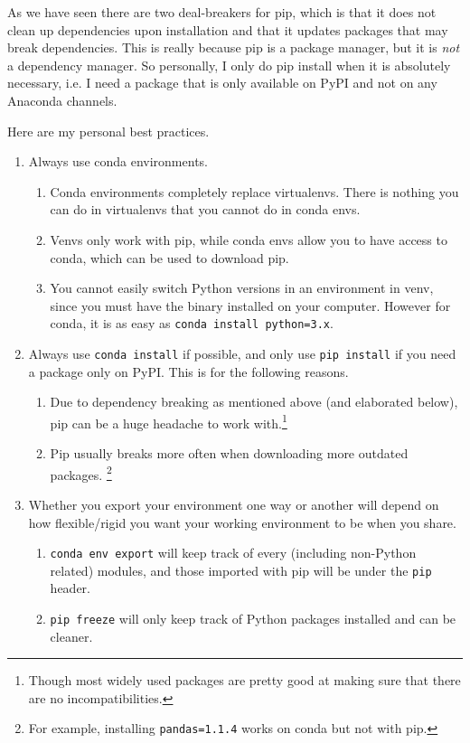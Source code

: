   As we have seen there are two deal-breakers for pip, which is that it does not clean up dependencies upon installation and that it updates packages that may break dependencies. This is really because pip is a package manager, but it is \textit{not} a dependency manager. So personally, I only do pip install when it is absolutely necessary, i.e. I need a package that is only available on PyPI and not on any Anaconda channels. 

  \begin{theorem}
    \label{thm:best-practices-for-using-conda-and-pip}
    Here are my personal best practices. 
    \begin{enumerate}
      \item Always use conda environments. 
        \begin{enumerate}
          \item Conda environments completely replace virtualenvs. There is nothing you can do in virtualenvs that you cannot do in conda envs. 
          \item Venvs only work with pip, while conda envs allow you to have access to conda, which can be used to download pip. 
          \item You cannot easily switch Python versions in an environment in venv, since you must have the binary installed on your computer. However for conda, it is as easy as \texttt{conda install python=3.x}. 
        \end{enumerate}
      \item Always use \texttt{conda install} if possible, and only use \texttt{pip install} if you need a package only on PyPI. This is for the following reasons. 
        \begin{enumerate}
          \item Due to dependency breaking as mentioned above (and elaborated below), pip can be a huge headache to work with.\footnote{Though most widely used packages are pretty good at making sure that there are no incompatibilities.} 
          \item Pip usually breaks more often when downloading more outdated packages. \footnote{For example, installing \texttt{pandas=1.1.4} works on conda but not with pip. }
        \end{enumerate}

        \item Whether you export your environment one way or another will depend on how flexible/rigid you want your working environment to be when you share. 
          \begin{enumerate}
            \item \texttt{conda env export} will keep track of every (including non-Python related) modules, and those imported with pip will be under the \texttt{pip} header. 
            \item \texttt{pip freeze} will only keep track of Python packages installed and can be cleaner. 
          \end{enumerate}
    \end{enumerate}
  \end{theorem}


